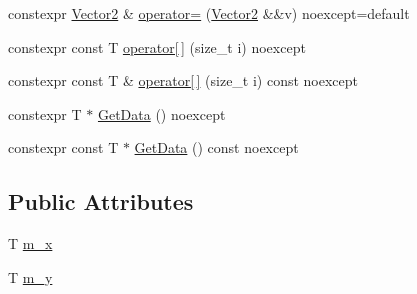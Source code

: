 \begin{DoxyCompactItemize}
\item 
constexpr \hyperlink{structmage_1_1_vector2}{Vector2} \& \hyperlink{structmage_1_1_vector2_3_01_t_00_01typename_01std_1_1enable__if__t_3_01std_1_1is__arithmetic__v_3_01_t_01_4_00_01void_01_4_01_4_ada30d8074f6248b662d85e643cd2e74e}{operator=} (\hyperlink{structmage_1_1_vector2}{Vector2} \&\&v) noexcept=default
\item 
constexpr const T \hyperlink{structmage_1_1_vector2_3_01_t_00_01typename_01std_1_1enable__if__t_3_01std_1_1is__arithmetic__v_3_01_t_01_4_00_01void_01_4_01_4_ad4e66e44c59e34b4f76f099f7ebb7420}{operator\mbox{[}$\,$\mbox{]}} (size\+\_\+t i) noexcept
\item 
constexpr const T \& \hyperlink{structmage_1_1_vector2_3_01_t_00_01typename_01std_1_1enable__if__t_3_01std_1_1is__arithmetic__v_3_01_t_01_4_00_01void_01_4_01_4_acc9b027c370b6dd525e1966c3bc973b4}{operator\mbox{[}$\,$\mbox{]}} (size\+\_\+t i) const noexcept
\item 
constexpr T $\ast$ \hyperlink{structmage_1_1_vector2_3_01_t_00_01typename_01std_1_1enable__if__t_3_01std_1_1is__arithmetic__v_3_01_t_01_4_00_01void_01_4_01_4_a2e8d5077a70dd4e89f58abd49a60e250}{Get\+Data} () noexcept
\item 
constexpr const T $\ast$ \hyperlink{structmage_1_1_vector2_3_01_t_00_01typename_01std_1_1enable__if__t_3_01std_1_1is__arithmetic__v_3_01_t_01_4_00_01void_01_4_01_4_ad6e08e161a4665e596c1bad2005bbc58}{Get\+Data} () const noexcept
\end{DoxyCompactItemize}
\subsection*{Public Attributes}
\begin{DoxyCompactItemize}
\item 
T \hyperlink{structmage_1_1_vector2_3_01_t_00_01typename_01std_1_1enable__if__t_3_01std_1_1is__arithmetic__v_3_01_t_01_4_00_01void_01_4_01_4_af5aba87d900fbc0cc9969404ec4e5275}{m\+\_\+x}
\item 
T \hyperlink{structmage_1_1_vector2_3_01_t_00_01typename_01std_1_1enable__if__t_3_01std_1_1is__arithmetic__v_3_01_t_01_4_00_01void_01_4_01_4_a11918fcf04043c20192ff5b1ded467b8}{m\+\_\+y}
\end{DoxyCompactItemize}


